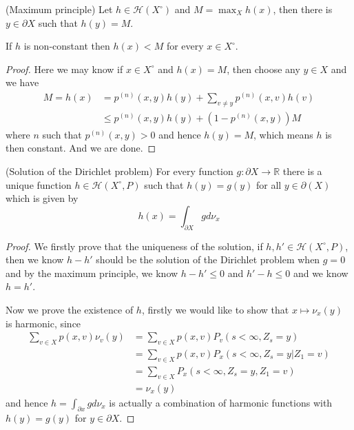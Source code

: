 \documentclass[lang=en,11pt,a4paper,citestyle =authoryear]{elegantpaper}
\newcommand{\R}{\mathbb{R}}
\newcommand{\Har}{\mathcal{H}}
\begin{document}
\begin{lemma}
    (Maximum principle) Let $h \in \Har(X^{\circ})$ and $M = \max_X h(x)$, then there is $y\in \partial X$ such that $h(y) = M$.\par
    If $h$ is non-constant then $h(x) < M$ for every $x\in X^{\circ}$.
\end{lemma}
\begin{proof}
    Here we may know if $x\in X^{\circ}$ and $h(x) = M$, then choose any $y\in X$ and we have
    \[
    \begin{aligned}
    M = h(x) &= p^{(n)}(x,y)h(y) + \sum\limits_{v\neq y}p^{(n)}(x,v)h(v) \\
    &\leq p^{(n)}(x,y)h(y) + (1-p^{(n)}(x,y))M
    \end{aligned}
    \]
    where $n$ such that $p^{(n)}(x,y) > 0$ and hence $h(y) = M$, which means $h$ is then constant. And we are done.
\end{proof}

\begin{theorem}
    (Solution of the Dirichlet problem) For every function $g:\partial X\to \R$ there is a unique function $h\in \Har(X^{\circ},P)$ such that $h(y) = g(y)$ for all $y\in \partial(X)$ which is given by
    \[
    h(x) = \int_{\partial X} gd\nu_x
    \]
\end{theorem}
\begin{proof}
    We firstly prove that the uniqueness of the solution, if $h,h' \in \Har(X^{\circ}, P)$, then we know $h - h'$ should be the solution of the  Dirichlet problem when $g = 0$ and by the maximum principle, we know $h-h' \leq 0$ and $h'-h\leq 0$ and we know $ h = h'$.\par
    Now we prove the existence of $h$, firstly we would like to show that $x\mapsto \nu_x(y)$ is harmonic, since
    \[
    \begin{aligned}
    \sum\limits_{v\in X}p(x,v)\nu_v(y) &= \sum\limits_{v\in X}p(x,v)P_v(s<\infty, Z_s = y)\\ &= \sum\limits_{v\in X}p(x,v)P_x(s<\infty, Z_s = y|Z_1 = v) \\ &= \sum\limits_{v\in X}P_x(s<\infty, Z_s = y, Z_1 = v) \\ &= \nu_x(y)
    \end{aligned}
    \]
    and hence $h = \int_{\partial x}gd\nu_x$ is actually a combination of harmonic functions with $h(y) = g(y)$ for $y\in \partial X$.
\end{proof}
\end{document}
